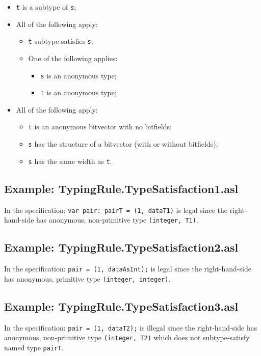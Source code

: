 \documentclass{book}
\begin{document}
 \begin{itemize}
 \item \texttt{t} is a subtype of \texttt{s};
 \item All of the following apply:
    \begin{itemize}
    \item \texttt{t} subtype-satisfies \texttt{s};
    \item One of the following applies:
      \begin{itemize}
      \item \texttt{s} is an anonymous type;
      \item \texttt{t} is an anonymous type;
      \end{itemize}
    \end{itemize}
  \item All of the following apply:
    \begin{itemize}
    \item \texttt{t} is an anonymous bitvector with no bitfields;
    \item \texttt{s} has the structure of a bitvector (with or without bitfields);
    \item \texttt{s} has the same width as \texttt{t}.
    \end{itemize}
  \end{itemize}

\subsection{Example: TypingRule.TypeSatisfaction1.asl}
    In the specification:
    \texttt{var pair: pairT = (1, dataT1)} is legal since the right-hand-side has
    anonymous, non-primitive type \texttt{(integer, T1)}.

\subsection{Example: TypingRule.TypeSatisfaction2.asl}
    In the specification:
    \texttt{pair = (1, dataAsInt);} is legal since the right-hand-side has anonymous,
    primitive type \texttt{(integer, integer)}.

\subsection{Example: TypingRule.TypeSatisfaction3.asl}
    In the specification:
    \texttt{pair = (1, dataT2);} is illegal since the right-hand-side has anonymous,
    non-primitive type \texttt{(integer, T2)} which does not subtype-satisfy named
    type \texttt{pairT}.
\end{document}
